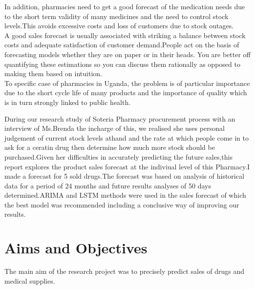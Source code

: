 \documentclass[12pt]{report}
\begin{document}
In addition, pharmacies need to get a good forecast of the medication needs due to the short term validity of many medicines and the need to control stock levels.This avoids excessive costs and loss of customers due to stock outages.\\

A good sales forecast is usually associated with striking a balance between stock costs and adequate satisfaction of customer demand.People act on the basis of forecasting models whether they are on paper or in their heads. You are better off quantifying these estimations so you can discuss them rationally as opposed to making them based on intuition.\\

To specific case of pharmacies in Uganda, the problem is of particular importance due to the short cycle life of many products and the importance of quality which is in turn strongly linked to public health.


During our research study of Soteria Pharmacy procurement process with an interview of Ms.Brenda the incharge of this, we realised she uses personal judgement of current stock levels athand and the rate at which people come in to ask for a ceratin drug then determine how much more stock should be purchased.Given her difficulties in accurately predicting the future sales,this report explores the product sales forecast at the indiviual level of this Pharmacy.I made a forecast for 5 sold drugs.The forecast was based on analysis of  historical data for a period of 24 months and future results analyses of 50 days determined.ARIMA and LSTM methods were used in the sales forecast of which the best model was recommended including a conclusive way of improving our results.
\section{Aims and Objectives}
The main aim of the research project was to precisely predict sales of drugs and medical supplies.
\end{document}

